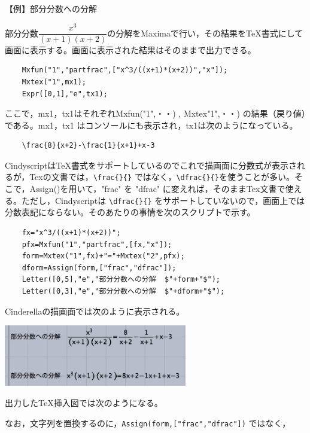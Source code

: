 \documentclass[papersize,a4paper,12pt,uplatex]{jsarticle}
\begin{document}
\begin{description}
\vspace{\baselineskip}
【例】部分分数への分解
\begin{spacing}{1.5}
  部分分数$\dfrac{x^3}{(x+1)(x+2)}$の分解をMaximaで行い，その結果をTeX書式にして画面に表示する。画面に表示された結果はそのまま\ketcindy で出力できる。
\end{spacing}
\begin{verbatim}
    Mxfun("1","partfrac",["x^3/((x+1)*(x+2))","x"]);
    Mxtex("1",mx1);
    Expr([0,1],"e",tx1);
\end{verbatim}
  ここで，mx1，tx1はそれぞれMxfun("1",・・) , Mxtex"1",・・) の結果（戻り値）である。mx1，tx1 はコンソールにも表示され，tx1は次のようになっている。
\begin{verbatim}
    \frac{8}{x+2}-\frac{1}{x+1}+x-3 
\end{verbatim}
  CindyscriptはTeX書式をサポートしているのでこれで描画面に分数式が表示されるが，Texの文書では，\verb|\frac{}{}| ではなく，\verb|\dfrac{}{}|を使うことが多い。そこで，Assign()を用いて，"frac" を "dfrac" に変えれば，そのままTex文書で使える。ただし，Cindyscriptは \verb|\dfrac{}{}| をサポートしていないので，画面上では分数表記にならない。そのあたりの事情を次のスクリプトで示す。
\begin{verbatim}
    fx="x^3/((x+1)*(x+2))";
    pfx=Mxfun("1","partfrac",[fx,"x"]);
    form=Mxtex("1",fx)+"="+Mxtex("2",pfx);
    dform=Assign(form,["frac","dfrac"]);
    Letter([0,5],"e","部分分数への分解  $"+form+"$");
    Letter([0,3],"e","部分分数への分解  $"+dform+"$");
\end{verbatim}
Cinderellaの描画面では次のように表示される。

\vspace{\baselineskip}
\hspace{20mm} \includegraphics[bb=0 0 347.02 116.01 , width=8cm]{Fig/mxtex01.pdf}
        
\vspace{\baselineskip}
出力したTeX挿入図では次のようになる。

\vspace{\baselineskip}
 

なお，文字列を置換するのに，\verb|Assign(form,["frac","dfrac"])| ではなく，


\end{description}
\end{document}
